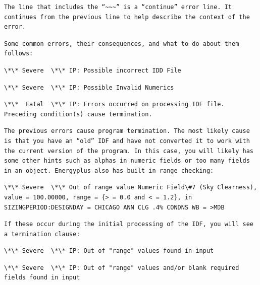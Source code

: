\begin{lstlisting}
The line that includes the “~~~” is a “continue” error line. It continues from the previous line to help describe the context of the error.
\end{lstlisting}

\begin{lstlisting}
Some common errors, their consequences, and what to do about them follows:
\end{lstlisting}

\begin{lstlisting}
\*\* Severe  \*\* IP: Possible incorrect IDD File
\end{lstlisting}

\begin{lstlisting}
\*\* Severe  \*\* IP: Possible Invalid Numerics
\end{lstlisting}

\begin{lstlisting}
\*\*  Fatal  \*\* IP: Errors occurred on processing IDF file. Preceding condition(s) cause termination.
\end{lstlisting}

\begin{lstlisting}
The previous errors cause program termination. The most likely cause is that you have an “old” IDF and have not converted it to work with the current version of the program. In this case, you will likely has some other hints such as alphas in numeric fields or too many fields in an object. Energyplus also has built in range checking:
\end{lstlisting}

\begin{lstlisting}
\*\* Severe  \*\* Out of range value Numeric Field\#7 (Sky Clearness), value = 100.00000, range = {> = 0.0 and < = 1.2}, in SIZINGPERIOD:DESIGNDAY = CHICAGO ANN CLG .4% CONDNS WB = >MDB
\end{lstlisting}

\begin{lstlisting}
If these occur during the initial processing of the IDF, you will see a termination clause:
\end{lstlisting}

\begin{lstlisting}
\*\* Severe  \*\* IP: Out of "range" values found in input
\end{lstlisting}

\begin{lstlisting}
\*\* Severe  \*\* IP: Out of "range" values and/or blank required fields found in input
\end{lstlisting}

